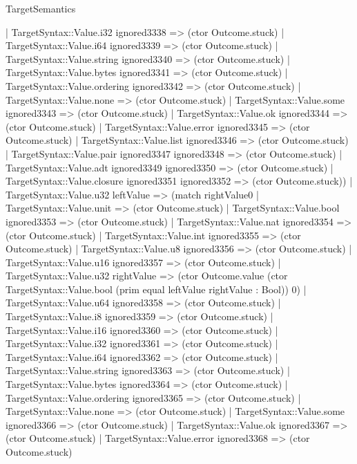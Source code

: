 \begin{lexlean}{TargetSemantics}
\begin{semanticmodule}
{              | TargetSyntax::Value.i32 ignored3338 => (ctor Outcome.stuck)
              | TargetSyntax::Value.i64 ignored3339 => (ctor Outcome.stuck)
              | TargetSyntax::Value.string ignored3340 => (ctor Outcome.stuck)
              | TargetSyntax::Value.bytes ignored3341 => (ctor Outcome.stuck)
              | TargetSyntax::Value.ordering ignored3342 => (ctor Outcome.stuck)
              | TargetSyntax::Value.none => (ctor Outcome.stuck)
              | TargetSyntax::Value.some ignored3343 => (ctor Outcome.stuck)
              | TargetSyntax::Value.ok ignored3344 => (ctor Outcome.stuck)
              | TargetSyntax::Value.error ignored3345 => (ctor Outcome.stuck)
              | TargetSyntax::Value.list ignored3346 => (ctor Outcome.stuck)
              | TargetSyntax::Value.pair ignored3347 ignored3348 => (ctor Outcome.stuck)
              | TargetSyntax::Value.adt ignored3349 ignored3350 => (ctor Outcome.stuck)
              | TargetSyntax::Value.closure ignored3351 ignored3352 => (ctor Outcome.stuck))
            | TargetSyntax::Value.u32 leftValue => (match rightValue0
              | TargetSyntax::Value.unit => (ctor Outcome.stuck)
              | TargetSyntax::Value.bool ignored3353 => (ctor Outcome.stuck)
              | TargetSyntax::Value.nat ignored3354 => (ctor Outcome.stuck)
              | TargetSyntax::Value.int ignored3355 => (ctor Outcome.stuck)
              | TargetSyntax::Value.u8 ignored3356 => (ctor Outcome.stuck)
              | TargetSyntax::Value.u16 ignored3357 => (ctor Outcome.stuck)
              | TargetSyntax::Value.u32 rightValue => (ctor Outcome.value (ctor TargetSyntax::Value.bool (prim equal leftValue rightValue : Bool)) 0)
              | TargetSyntax::Value.u64 ignored3358 => (ctor Outcome.stuck)
              | TargetSyntax::Value.i8 ignored3359 => (ctor Outcome.stuck)
              | TargetSyntax::Value.i16 ignored3360 => (ctor Outcome.stuck)
              | TargetSyntax::Value.i32 ignored3361 => (ctor Outcome.stuck)
              | TargetSyntax::Value.i64 ignored3362 => (ctor Outcome.stuck)
              | TargetSyntax::Value.string ignored3363 => (ctor Outcome.stuck)
              | TargetSyntax::Value.bytes ignored3364 => (ctor Outcome.stuck)
              | TargetSyntax::Value.ordering ignored3365 => (ctor Outcome.stuck)
              | TargetSyntax::Value.none => (ctor Outcome.stuck)
              | TargetSyntax::Value.some ignored3366 => (ctor Outcome.stuck)
              | TargetSyntax::Value.ok ignored3367 => (ctor Outcome.stuck)
              | TargetSyntax::Value.error ignored3368 => (ctor Outcome.stuck)
}
\end{semanticmodule}
\end{lexlean}
